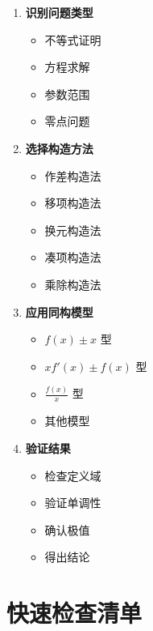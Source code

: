 \documentclass[a4paper,11pt]{ctexrep}
\theoremstyle{definition}
\begin{document}
\begin{tipbox}[构造函数思维导图]
\begin{enumerate}
    \item \textbf{识别问题类型}
    \begin{itemize}
        \item 不等式证明
        \item 方程求解
        \item 参数范围
        \item 零点问题
    \end{itemize}
    
    \item \textbf{选择构造方法}
    \begin{itemize}
        \item 作差构造法
        \item 移项构造法
        \item 换元构造法
        \item 凑项构造法
        \item 乘除构造法
    \end{itemize}
    
    \item \textbf{应用同构模型}
    \begin{itemize}
        \item $f(x) \pm x$ 型
        \item $xf'(x) \pm f(x)$ 型
        \item $\frac{f(x)}{x}$ 型
        \item 其他模型
    \end{itemize}
    
    \item \textbf{验证结果}
    \begin{itemize}
        \item 检查定义域
        \item 验证单调性
        \item 确认极值
        \item 得出结论
    \end{itemize}
\end{enumerate}
\end{tipbox}

\section{快速检查清单}
\end{document}
